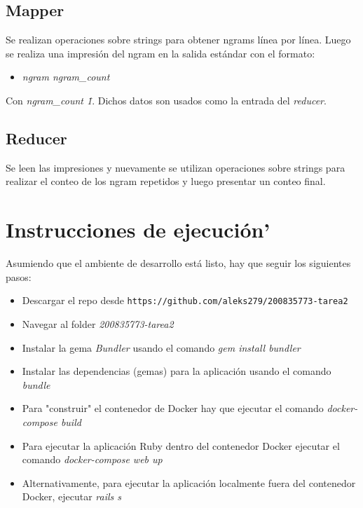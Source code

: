 \documentclass{article}
\begin{document}
\subsection{Mapper}
Se realizan operaciones sobre strings para obtener ngrams l\'inea por l\'inea. Luego se realiza una impresi\'on del ngram en la salida est\'andar con el formato:
\begin{itemize}
  \item \emph{ngram ngram\_count}
\end{itemize}
Con \emph{ngram\_count \= 1}. Dichos datos son usados como la entrada del \emph{reducer}.
\subsection{Reducer}
Se leen las impresiones y nuevamente se utilizan operaciones sobre strings para realizar el conteo de los ngram repetidos y luego presentar un conteo final.

\section{Instrucciones de ejecuci\'on'}
Asumiendo que el ambiente de desarrollo est\'a listo, hay que seguir los siguientes pasos:
\begin{itemize}
  \item Descargar el repo desde \texttt{https://github.com/aleks279/200835773-tarea2}
  \item Navegar al folder \emph{200835773-tarea2}
  \item Instalar la gema \emph{Bundler} usando el comando \emph{gem install bundler}
  \item Instalar las dependencias (gemas) para la aplicaci\'on usando el comando \emph{bundle}
  \item Para "construir" el contenedor de Docker hay que ejecutar el comando \emph{docker-compose build}
  \item Para ejecutar la aplicaci\'on Ruby dentro del contenedor Docker ejecutar el comando \emph{docker-compose web up}
  \item Alternativamente, para ejecutar la aplicaci\'on localmente fuera del contenedor Docker, ejecutar \emph{rails s}
\end{itemize}
\end{document}
